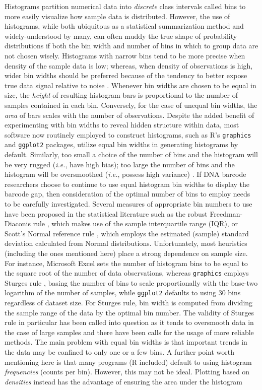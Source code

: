 Histograms partition numerical data into \textit{discrete} class intervals called bins to more easily visualize how sample data is distributed. However, the use of histograms, while both ubiquitous as a statistical summarization method and widely-understood by many, can often muddy the true shape of probability distributions if both the bin width and number of bins in which to group data are not chosen wisely. Histograms with narrow bins tend to be more precise when density of the sample data is low; whereas, when density of observations is high, wider bin widths should be preferred because of the tendency to better expose true data signal relative to noise \cite{scott1979optimal}. Whenever bin widths are chosen to be equal in size, the \textit{height} of resulting histogram bars is proportional to the number of samples contained in each bin. Conversely, for the case of unequal bin widths, the \textit{area} of bars scales with the number of observations. Despite the added benefit of experimenting with bin widths to reveal hidden structure within data, most software now routinely employed to construct histograms, such as R's {\tt graphics} \cite{r2018language} and {\tt ggplot2} packages, utilize equal bin widths in generating histograms by default. Similarly, too small a choice of the number of bins and the histogram will be very rugged (\textit{i.e.}, have high bias); too large the number of bins and the histogram will be oversmoothed (\textit{i.e.}, possess high variance) \cite{scott1979optimal}. If DNA barcode researchers choose to continue to use equal histogram bin widths to display the barcode gap, then consideration of the optimal number of bins to employ needs to be carefully investigated. Several measures of appropriate bin numbers to use have been proposed in the statistical literature such as the robust Freedman-Diaconis rule \cite{freedman1981on}, which makes use of the sample interquartile range (IQR), or Scott's Normal reference rule \cite{scott1979optimal}, which employs the estimated (sample) standard deviation calculated from Normal distributions. Unfortunately, most heuristics (including the ones mentioned here) place a strong dependence on sample size. For instance, Microsoft{\textregistered} Excel sets the number of histogram bins to be equal to the square root of the number of data observations, whereas {\tt graphics} employs Sturges rule \cite{sturges1926choice}, basing the number of bins to scale proportionally with the base-two logarithm of the number of samples, while {\tt ggplot2} defaults to using 30 bins regardless of dataset size. For Sturges rule, bin width is computed from dividing the sample range of the data by the optimal bin number. The validity of Sturges rule in particular has been called into question as it tends to oversmooth data in the case of large samples \cite{hyndman1995problem} and there have been calls for the usage of more reliable methods. The main problem with equal bin widths is that important trends in the data may be confined to only one or a few bins. A further point worth mentioning here is that many programs (R included) default to using histogram \textit{frequencies} (counts per bin). However, this may not be ideal. Plotting based on \textit{densities} instead has the advantage of ensuring the area under the histogram 